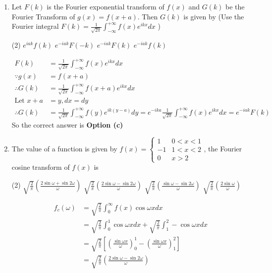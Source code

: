 \begin{enumerate}
	\item Let $F(k)$ is the Fourier exponential transform of $f(x)$ and $G(k)$ be the Fourier Transform of $g(x)=f(x+a)$. Then $G(k)$ is given by
	(Use the Fourier integral $F(k)=\frac{1}{\sqrt{2 \pi}} \int_{-\infty}^{+\infty} f(x) e^{i k x} d x$ )
	\begin{tasks}(2)
		\task[\textbf{a.}]$e^{i a k} f(k)$
		\task[\textbf{b.}]$e^{-i a k} F(-k)$
		\task[\textbf{c.}] $e^{-i a k} F(k)$
		\task[\textbf{d.}] $e^{-i a k} f(k)$
	\end{tasks}
	\begin{answer}
	\begin{align*}
	F(k)&=\frac{1}{\sqrt{2 \pi}} \int_{-\infty}^{+\infty} f(x) e^{i k x} d x\\
	\because g(x)&=f(x+a)\\
	\therefore G(k)&=\frac{1}{\sqrt{2 \pi}} \int_{-\infty}^{+\infty} f(x+a) e^{i k x} d x\\
	\text{Let }x+a&=y, d x=d y\\
	\therefore G(k)&=\frac{1}{\sqrt{2 \pi}} \int_{-\infty}^{+\infty} f(y) e^{i k(y-a)} d y=e^{-i k a} \frac{1}{\sqrt{2 \pi}} \int_{-\infty}^{+\infty} f(x) e^{i k x} d x=e^{-i a k} F(k)
	\end{align*}
	So the correct answer is \textbf{Option (c)}
\end{answer}
	\item The value of a function is given by $f(x)=\left\{\begin{array}{cc}1 & 0<x<1 \\ -1 & 1<x<2 \\ 0 & x>2\end{array}\right.$, the Fourier cosine transform of $f(x)$ is
	\begin{tasks}(2)
		\task[\textbf{a.}]$\sqrt{\frac{2}{\pi}}\left(\frac{2 \sin \omega+\sin 2 \omega}{\omega}\right)$
		\task[\textbf{b.}]$\sqrt{\frac{2}{\pi}}\left(\frac{2 \sin \omega-\sin 2 \omega}{\omega}\right)$
		\task[\textbf{c.}]$\sqrt{\frac{2}{\pi}}\left(\frac{\sin \omega-\sin 2 \omega}{\omega}\right)$
		\task[\textbf{d.}] $\sqrt{\frac{2}{\pi}}\left(\frac{2 \sin \omega}{\omega}\right)$
	\end{tasks}
\begin{answer}
	\begin{align*}
	f_{c}(\omega) &=\sqrt{\frac{2}{\pi}} \int_{0}^{\infty} f(x) \cos \omega x d x \\ &=\sqrt{\frac{2}{\pi}} \int_{0}^{1} \cos \omega x d x+\sqrt{\frac{2}{\pi}} \int_{1}^{2}-\cos \omega x d x \\ &=\sqrt{\frac{2}{\pi}}\left[\left(\frac{\sin \omega x}{\omega}\right)_{0}^{1}-\left(\frac{\sin \omega x}{\omega}\right)_{1}^{2}\right] \\ &=\sqrt{\frac{2}{\pi}}\left(\frac{2 \sin \omega-\sin 2 \omega}{\omega}\right) 

\end{align*}
\end{answer}
\end{enumerate}
